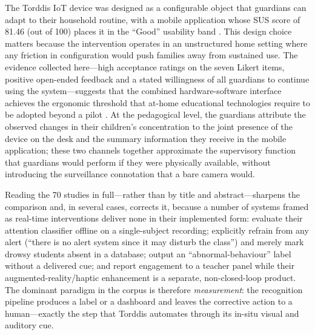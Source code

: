 The Torddis IoT device was designed as a configurable object that guardians can adapt to their household routine, with a mobile application whose SUS score of 81.46 (out of 100) places it in the ``Good'' usability band \citep{Brooke1996SUS}. This design choice matters because the intervention operates in an unstructured home setting where any friction in configuration would push families away from sustained use. The evidence collected here---high acceptance ratings on the seven Likert items, positive open-ended feedback and a stated willingness of all guardians to continue using the system---suggests that the combined hardware-software interface achieves the ergonomic threshold that at-home educational technologies require to be adopted beyond a pilot \citep{Li2024Systematic}. At the pedagogical level, the guardians attribute the observed changes in their children's concentration to the joint presence of the device on the desk and the summary information they receive in the mobile application; these two channels together approximate the supervisory function that guardians would perform if they were physically available, without introducing the surveillance connotation that a bare camera would.

Reading the 70 studies in full---rather than by title and abstract---sharpens the comparison and, in several cases, corrects it, because a number of systems framed as real-time interventions deliver none in their implemented form: \citet{Wang2018Attention} evaluate their attention classifier offline on a single-subject recording; \citet{R2022Drowsiness} explicitly refrain from any alert (``there is no alert system since it may disturb the class'') and merely mark drowsy students absent in a database; \citet{Xu2024Identifying} output an ``abnormal-behaviour'' label without a delivered cue; and \citet{Poonja2023Engagement} report engagement to a teacher panel while their augmented-reality/haptic enhancement is a separate, non-closed-loop product. The dominant paradigm in the corpus is therefore \emph{measurement}: the recognition pipeline produces a label or a dashboard and leaves the corrective action to a human---exactly the step that Torddis automates through its in-situ visual and auditory cue.

